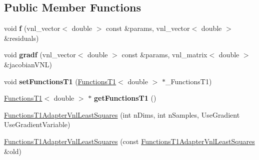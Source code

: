\subsection*{Public Member Functions}
\begin{DoxyCompactItemize}
\item 
\hypertarget{class_ox_1_1_functions_t1_adapter_vnl_least_squares_a9ccef57fbf5dbe160f8e2b520482613b}{void {\bfseries f} (vnl\-\_\-vector$<$ double $>$ const \&params, vnl\-\_\-vector$<$ double $>$ \&residuals)}\label{class_ox_1_1_functions_t1_adapter_vnl_least_squares_a9ccef57fbf5dbe160f8e2b520482613b}

\item 
\hypertarget{class_ox_1_1_functions_t1_adapter_vnl_least_squares_a9daa157011b1fdd91198ad5c5a765f09}{void {\bfseries gradf} (vnl\-\_\-vector$<$ double $>$ const \&params, vnl\-\_\-matrix$<$ double $>$ \&jacobian\-V\-N\-L)}\label{class_ox_1_1_functions_t1_adapter_vnl_least_squares_a9daa157011b1fdd91198ad5c5a765f09}

\item 
\hypertarget{class_ox_1_1_functions_t1_adapter_vnl_least_squares_aae77f00cf870a0c31c4d7830ee5a053a}{void {\bfseries set\-Functions\-T1} (\hyperlink{class_ox_1_1_functions_t1}{Functions\-T1}$<$ double $>$ $\ast$\-\_\-\-Functions\-T1)}\label{class_ox_1_1_functions_t1_adapter_vnl_least_squares_aae77f00cf870a0c31c4d7830ee5a053a}

\item 
\hypertarget{class_ox_1_1_functions_t1_adapter_vnl_least_squares_a67669d931b4bb96a60ead54b63a17e05}{\hyperlink{class_ox_1_1_functions_t1}{Functions\-T1}$<$ double $>$ $\ast$ {\bfseries get\-Functions\-T1} ()}\label{class_ox_1_1_functions_t1_adapter_vnl_least_squares_a67669d931b4bb96a60ead54b63a17e05}

\item 
\hyperlink{class_ox_1_1_functions_t1_adapter_vnl_least_squares_a32fc1a585b66ffa3a2e19c1f51d96851}{Functions\-T1\-Adapter\-Vnl\-Least\-Squares} (int n\-Dims, int n\-Samples, Use\-Gradient Use\-Gradient\-Variable)
\item 
\hyperlink{class_ox_1_1_functions_t1_adapter_vnl_least_squares_aa083ecf32daf91e03d44fe7b43adcd57}{Functions\-T1\-Adapter\-Vnl\-Least\-Squares} (const \hyperlink{class_ox_1_1_functions_t1_adapter_vnl_least_squares}{Functions\-T1\-Adapter\-Vnl\-Least\-Squares} \&old)
\end{DoxyCompactItemize}


